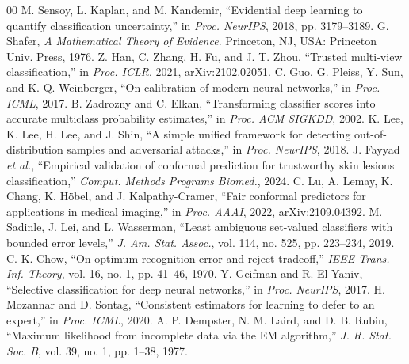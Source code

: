 \documentclass[conference]{IEEEtran}
\begin{document}
\begin{thebibliography}{00}
 M. Sensoy, L. Kaplan, and M. Kandemir, ``Evidential deep learning to quantify classification uncertainty,'' in \textit{Proc. NeurIPS}, 2018, pp. 3179--3189.
 G. Shafer, \textit{A Mathematical Theory of Evidence}. Princeton, NJ, USA: Princeton Univ. Press, 1976.
 Z. Han, C. Zhang, H. Fu, and J. T. Zhou, ``Trusted multi-view classification,'' in \textit{Proc. ICLR}, 2021, arXiv:2102.02051.
 C. Guo, G. Pleiss, Y. Sun, and K. Q. Weinberger, ``On calibration of modern neural networks,'' in \textit{Proc. ICML}, 2017.
 B. Zadrozny and C. Elkan, ``Transforming classifier scores into accurate multiclass probability estimates,'' in \textit{Proc. ACM SIGKDD}, 2002.
 K. Lee, K. Lee, H. Lee, and J. Shin, ``A simple unified framework for detecting out-of-distribution samples and adversarial attacks,'' in \textit{Proc. NeurIPS}, 2018.
 J. Fayyad \textit{et al.}, ``Empirical validation of conformal prediction for trustworthy skin lesions classification,'' \textit{Comput. Methods Programs Biomed.}, 2024.
 C. Lu, A. Lemay, K. Chang, K. H\"obel, and J. Kalpathy-Cramer, ``Fair conformal predictors for applications in medical imaging,'' in \textit{Proc. AAAI}, 2022, arXiv:2109.04392.
 M. Sadinle, J. Lei, and L. Wasserman, ``Least ambiguous set-valued classifiers with bounded error levels,'' \textit{J. Am. Stat. Assoc.}, vol. 114, no. 525, pp. 223--234, 2019.
 C. K. Chow, ``On optimum recognition error and reject tradeoff,'' \textit{IEEE Trans. Inf. Theory}, vol. 16, no. 1, pp. 41--46, 1970.
 Y. Geifman and R. El-Yaniv, ``Selective classification for deep neural networks,'' in \textit{Proc. NeurIPS}, 2017.
 H. Mozannar and D. Sontag, ``Consistent estimators for learning to defer to an expert,'' in \textit{Proc. ICML}, 2020.
 A. P. Dempster, N. M. Laird, and D. B. Rubin, ``Maximum likelihood from incomplete data via the EM algorithm,'' \textit{J. R. Stat. Soc. B}, vol. 39, no. 1, pp. 1--38, 1977.
\end{thebibliography}
\end{document}
